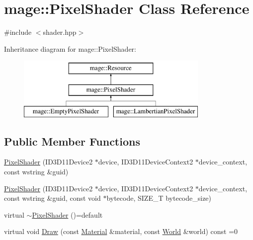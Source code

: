 \hypertarget{classmage_1_1_pixel_shader}{}\section{mage\+:\+:Pixel\+Shader Class Reference}
\label{classmage_1_1_pixel_shader}


{\ttfamily \#include $<$shader.\+hpp$>$}

Inheritance diagram for mage\+:\+:Pixel\+Shader\+:\begin{figure}[H]
\begin{center}
\leavevmode
\includegraphics[height=3.000000cm]{classmage_1_1_pixel_shader}
\end{center}
\end{figure}
\subsection*{Public Member Functions}
\begin{DoxyCompactItemize}
\item 
\hyperlink{classmage_1_1_pixel_shader_abf1a5e4a5a550553aea1427e80cd9403}{Pixel\+Shader} (I\+D3\+D11\+Device2 $\ast$device, I\+D3\+D11\+Device\+Context2 $\ast$device\+\_\+context, const wstring \&guid)
\item 
\hyperlink{classmage_1_1_pixel_shader_a0278c67883cbf9259ea83e7f6c8162a2}{Pixel\+Shader} (I\+D3\+D11\+Device2 $\ast$device, I\+D3\+D11\+Device\+Context2 $\ast$device\+\_\+context, const wstring \&guid, const void $\ast$bytecode, S\+I\+Z\+E\+\_\+T bytecode\+\_\+size)
\item 
virtual \hyperlink{classmage_1_1_pixel_shader_ac339b9196db24d18143ad36013d598b2}{$\sim$\+Pixel\+Shader} ()=default
\item 
virtual void \hyperlink{classmage_1_1_pixel_shader_ac7662093a83213881698dca25f8215a2}{Draw} (const \hyperlink{structmage_1_1_material}{Material} \&material, const \hyperlink{classmage_1_1_world}{World} \&world) const =0
\end{DoxyCompactItemize}
